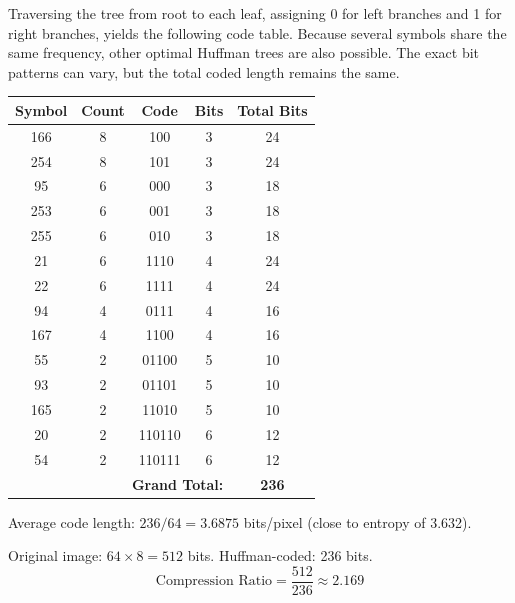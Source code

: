 \documentclass[12pt]{article}
\begin{document}
\begin{stepbox}
Traversing the tree from root to each leaf, assigning 0 for left branches and 1 for right branches, yields the following code table. Because several symbols share the same frequency, other optimal Huffman trees are also possible. The exact bit patterns can vary, but the total coded length remains the same.

\begin{center}
\renewcommand{\arraystretch}{1.15}
\begin{tabular}{|c|c|c|c|c|}
\hline
\textbf{Symbol} & \textbf{Count} & \textbf{Code} & \textbf{Bits} & \textbf{Total Bits} \\
\hline
166  & 8 & 100    & 3 & 24 \\
254  & 8 & 101    & 3 & 24 \\
95   & 6 & 000    & 3 & 18 \\
253  & 6 & 001    & 3 & 18 \\
255  & 6 & 010    & 3 & 18 \\
21   & 6 & 1110   & 4 & 24 \\
22   & 6 & 1111   & 4 & 24 \\
94   & 4 & 0111   & 4 & 16 \\
167  & 4 & 1100   & 4 & 16 \\
55   & 2 & 01100  & 5 & 10 \\
93   & 2 & 01101  & 5 & 10 \\
165  & 2 & 11010  & 5 & 10 \\
20   & 2 & 110110 & 6 & 12 \\
54   & 2 & 110111 & 6 & 12 \\
\hline
\multicolumn{4}{|r|}{\textbf{Grand Total:}} & \textbf{236} \\
\hline
\end{tabular}
\end{center}
\end{stepbox}

\begin{resultsbox}
Average code length: $236/64 = 3.6875$ bits/pixel (close to entropy of 3.632).

Original image: $64 \times 8 = 512$ bits. Huffman-coded: 236 bits.
\[
\boxed{\text{Compression Ratio} = \frac{512}{236} \approx 2.169}
\]
\end{resultsbox}


\vspace{0.4cm}
\end{document}
